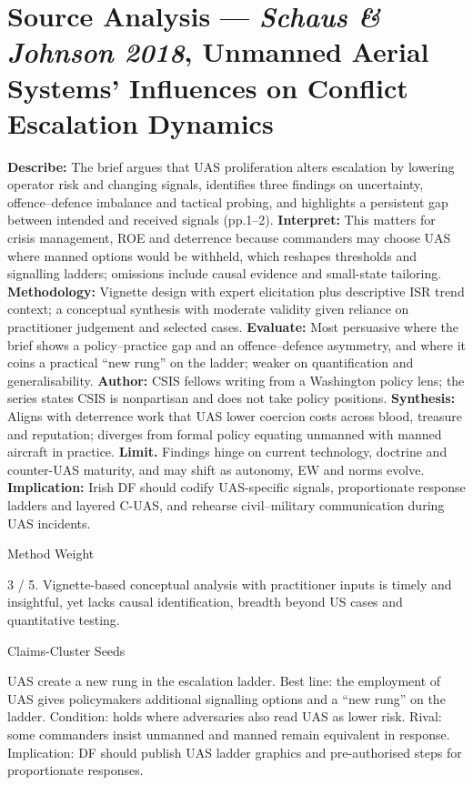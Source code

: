 \section*{Source Analysis — \textit{Schaus & Johnson 2018}, Unmanned Aerial Systems’ Influences on Conflict Escalation Dynamics}
\textbf{Describe:} The brief argues that UAS proliferation alters escalation by lowering operator risk and changing signals, identifies three findings on uncertainty, offence–defence imbalance and tactical probing, and highlights a persistent gap between intended and received signals (pp.1–2).
\textbf{Interpret:} This matters for crisis management, ROE and deterrence because commanders may choose UAS where manned options would be withheld, which reshapes thresholds and signalling ladders; omissions include causal evidence and small-state tailoring.
\textbf{Methodology:} Vignette design with expert elicitation plus descriptive ISR trend context; a conceptual synthesis with moderate validity given reliance on practitioner judgement and selected cases.
\textbf{Evaluate:} Most persuasive where the brief shows a policy–practice gap and an offence–defence asymmetry, and where it coins a practical “new rung” on the ladder; weaker on quantification and generalisability.
\textbf{Author:} CSIS fellows writing from a Washington policy lens; the series states CSIS is nonpartisan and does not take policy positions.
\textbf{Synthesis:} Aligns with deterrence work that UAS lower coercion costs across blood, treasure and reputation; diverges from formal policy equating unmanned with manned aircraft in practice.
\textbf{Limit.} Findings hinge on current technology, doctrine and counter-UAS maturity, and may shift as autonomy, EW and norms evolve.
\textbf{Implication:} Irish DF should codify UAS-specific signals, proportionate response ladders and layered C-UAS, and rehearse civil–military communication during UAS incidents.

Method Weight

3 / 5. Vignette-based conceptual analysis with practitioner inputs is timely and insightful, yet lacks causal identification, breadth beyond US cases and quantitative testing.

Claims-Cluster Seeds

UAS create a new rung in the escalation ladder. Best line: the employment of UAS gives policymakers additional signalling options and a “new rung” on the ladder. Condition: holds where adversaries also read UAS as lower risk. Rival: some commanders insist unmanned and manned remain equivalent in response. Implication: DF should publish UAS ladder graphics and pre-authorised steps for proportionate responses.

